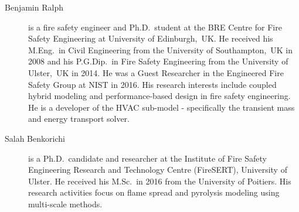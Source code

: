 \begin{description}
\item[Benjamin Ralph] is a fire safety engineer and Ph.D.~student at the BRE Centre for Fire Safety Engineering at University of Edinburgh,~UK. He received his M.Eng.~in Civil Engineering from the University of Southampton,~UK in 2008 and his P.G.Dip.~in Fire Safety Engineering from the University of Ulster,~UK in 2014. He was a Guest Researcher in the Engineered Fire Safety Group at NIST in 2016. His research interests include coupled hybrid modeling and performance-based design in fire safety engineering. He is a developer of the HVAC sub-model - specifically the transient mass and energy transport solver.

\item[Salah Benkorichi] is a Ph.D.~candidate and researcher at the Institute of Fire Safety Engineering Research and
Technology Centre (FireSERT), University of Ulster. He received his M.Sc.~in 2016 from the University of Poitiers.
His research activities focus on flame spread and pyrolysis modeling using multi-scale methods.

\end{description}


